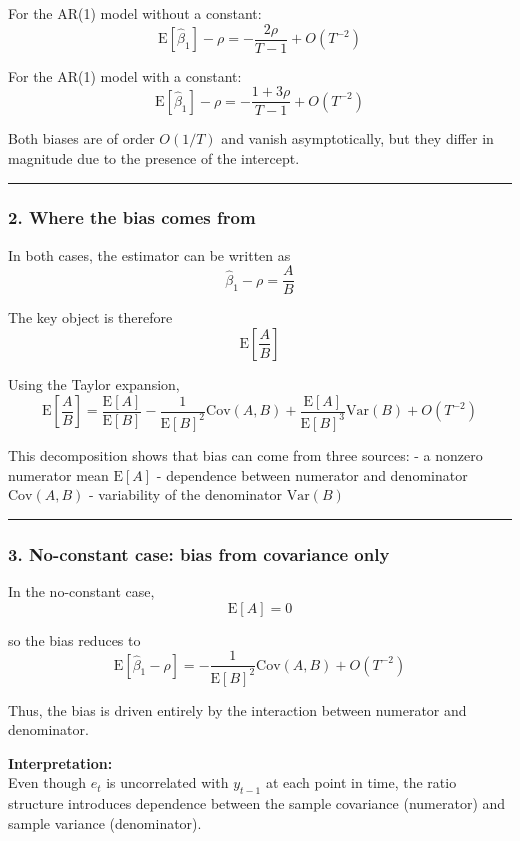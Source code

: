 \documentclass[11pt]{article}
\begin{document}
For the AR(1) model without a constant: \[
\text{E}[\hat\beta_1] - \rho
= -\frac{2\rho}{T-1} + O(T^{-2})
\]

For the AR(1) model with a constant: \[
\text{E}[\hat\beta_1] - \rho
= -\frac{1+3\rho}{T-1} + O(T^{-2})
\]

Both biases are of order \(O(1/T)\) and vanish asymptotically, but they
differ in magnitude due to the presence of the intercept.

\begin{center}\rule{0.5\linewidth}{0.5pt}\end{center}

\subsubsection{2. Where the bias comes
from}\label{where-the-bias-comes-from}

In both cases, the estimator can be written as \[
\hat\beta_1 - \rho = \frac{A}{B}
\]

The key object is therefore \[
\text{E}\!\left[\frac{A}{B}\right]
\]

Using the Taylor expansion, \[
\text{E}\!\left[\frac{A}{B}\right]
=
\frac{\text{E}[A]}{\text{E}[B]}
-\frac{1}{\text{E}[B]^2}\text{Cov}(A,B)
+\frac{\text{E}[A]}{\text{E}[B]^3}\text{Var}(B)
+O(T^{-2})
\]

This decomposition shows that bias can come from three sources: - a
nonzero numerator mean \(\text{E}[A]\) - dependence between numerator
and denominator \(\text{Cov}(A,B)\) - variability of the denominator
\(\text{Var}(B)\)

\begin{center}\rule{0.5\linewidth}{0.5pt}\end{center}

\subsubsection{3. No-constant case: bias from covariance
only}\label{no-constant-case-bias-from-covariance-only}

In the no-constant case, \[
\text{E}[A] = 0
\]

so the bias reduces to \[
\text{E}[\hat\beta_1 - \rho]
=
-\frac{1}{\text{E}[B]^2}\text{Cov}(A,B)
+O(T^{-2})
\]

Thus, the bias is driven entirely by the interaction between numerator
and denominator.

\textbf{Interpretation:}\\
Even though \(e_t\) is uncorrelated with \(y_{t-1}\) at each point in
time, the ratio structure introduces dependence between the sample
covariance (numerator) and sample variance (denominator).
\end{document}

